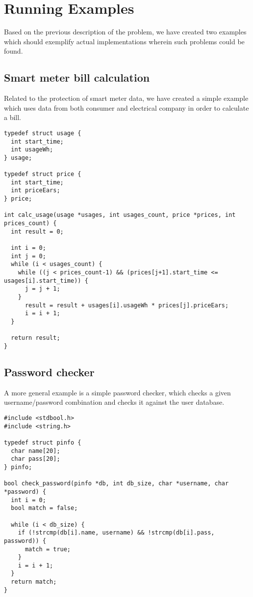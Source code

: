 
\section{Running Examples}
Based on the previous description of the problem, we have created two examples which should exemplify actual implementations wherein such problems could be found.

\subsection{Smart meter bill calculation}
Related to the protection of smart meter data, we have created a simple example which uses data from both consumer and electrical company in order to calculate a bill.

\begin{lstlisting}[style=dlmc]
typedef struct usage {
  int start_time;
  int usageWh;
} usage;

typedef struct price {
  int start_time;
  int priceEars;
} price;

int calc_usage(usage *usages, int usages_count, price *prices, int prices_count) {
  int result = 0;

  int i = 0;
  int j = 0;
  while (i < usages_count) {
    while ((j < prices_count-1) && (prices[j+1].start_time <= usages[i].start_time)) {
      j = j + 1;
    }
      result = result + usages[i].usageWh * prices[j].priceEars;
      i = i + 1;
  }

  return result;
}
\end{lstlisting}

\subsection{Password checker}
A more general example is a simple password checker, which checks a given username/password combination and checks it against the user database.

\begin{lstlisting}[style=dlmc]
#include <stdbool.h>
#include <string.h>

typedef struct pinfo {
  char name[20];
  char pass[20];
} pinfo;

bool check_password(pinfo *db, int db_size, char *username, char *password) {
  int i = 0;
  bool match = false;

  while (i < db_size) {
    if (!strcmp(db[i].name, username) && !strcmp(db[i].pass, password)) {
      match = true;
    }
    i = i + 1;
  }
  return match;
}
\end{lstlisting}
